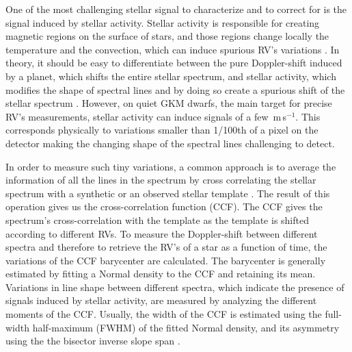 \documentclass[11pt, oneside]{article}
\def\ms{\hbox{\,m\,s$^{-1}$}}         %
\begin{document}

One of the most challenging stellar signal to characterize and to correct for is the signal induced by stellar activity. 
Stellar activity is responsible for creating magnetic regions on the surface of stars, and those regions change locally the temperature and the convection, which can induce spurious RV's variations \citep{Meunier-2010a, Dumusque-2014b}. 
In theory, it should be easy to differentiate between the pure Doppler-shift induced by a planet, which shifts the entire stellar spectrum, and stellar activity, which modifies the shape of spectral lines and by doing so create a spurious shift of the stellar spectrum \citep{Saar-1997b,Hatzes-2002,Kurster2003,Lindegren-2003,Desort-2007,Lagrange-2010,Meunier-2010a,Dumusque-2014b}. 
However, on quiet GKM dwarfs, the main target for precise RV's measurements, stellar activity can induce signals of a few \ms. This corresponds physically to variations smaller than 1/100th of a pixel on the detector making the changing shape of the spectral lines challenging to detect.

In order to measure such tiny variations, a common approach is to average the information of all the lines in the spectrum by cross correlating the stellar spectrum with a synthetic \citep[][]{Baranne-1996,Pepe-2002a} or an observed stellar template \citep[][]{Anglada-Escude-2012}. The result of this operation gives us the cross-correlation function (CCF).  The CCF gives the spectrum's cross-correlation with the template as the template is shifted according to different RVs.
%
To measure the Doppler-shift between different spectra and therefore to retrieve the RV's of a star as a function of time, the variations of the CCF barycenter are calculated. 
The barycenter is generally estimated by fitting a Normal density to the CCF and retaining its mean. Variations in line shape between different spectra, which indicate the presence of signals induced by stellar activity, are measured by analyzing the different moments of the CCF. Usually, the width of the CCF is estimated using the full-width half-maximum (FWHM) of the fitted Normal density, and its asymmetry using the the bisector inverse slope span \citep[BIS SPAN,][]{Queloz-2001}.

\end{document}
